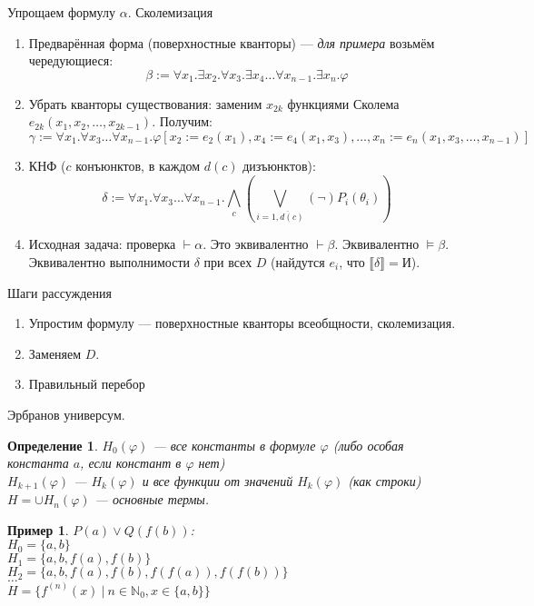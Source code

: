 \documentclass[aspectratio=169]{beamer}
\newtheorem{dfn}{Определение}[section]
\newtheorem{exm}{Пример}[section]
\begin{document}
\begin{frame}{Упрощаем формулу $\alpha$. Сколемизация}
\begin{enumerate}
\item Предварённая форма (поверхностные кванторы) --- \emph{для примера} возьмём чередующиеся:
$$\beta := \forall x_1.\exists x_2.\forall x_3.\exists x_4\dots \forall x_{n-1}.\exists x_n.\varphi$$

\item Убрать кванторы существования: заменим $x_{2k}$ функциями Сколема $e_{2k}(x_1,x_2,\dots,x_{2k-1})$.
Получим: $$\gamma := \forall x_1.\forall x_3\dots\forall x_{n-1}.\varphi[x_2:=e_2(x_1), x_4:=e_4(x_1,x_3), \dots, x_n := e_n(x_1,x_3,\dots,x_{n-1})]$$


\item КНФ ($c$ конъюнктов, в каждом $d(c)$ дизъюнктов):
$$\delta := \forall x_1.\forall x_3\dots\forall x_{n-1}.\bigwedge_c\left(\bigvee_{i = \overline{1,d(c)}} (\neg)P_i(\theta_i)\right)$$

\item Исходная задача: проверка $\vdash\alpha$. Это эквивалентно $\vdash\beta$. Эквивалентно $\models\beta$.
Эквивалентно выполнимости $\delta$ при всех $D$ (найдутся $e_i$, что $\llbracket\delta\rrbracket = \text{И}$).

\end{enumerate}
\end{frame}

\begin{frame}{Шаги рассуждения}
\begin{enumerate}
\item \color{gray}Упростим формулу --- поверхностные кванторы всеобщности, сколемизация.
\item \color{black}Заменяем $D$.
\item \color{gray}Правильный перебор
\end{enumerate}
\end{frame}


\begin{frame}{Эрбранов универсум.}
\begin{dfn}$H_0(\varphi)$ --- все константы в формуле $\varphi$ (либо особая константа $a$, если констант в $\varphi$ нет)\\
$H_{k+1}(\varphi)$ --- $H_k(\varphi)$ и все функции от значений $H_k(\varphi)$ (как строки)\\

$H = \cup H_n(\varphi)$ --- основные термы.
\end{dfn}

\begin{exm}$P(a)\vee Q(f(b))$: \\
$H_0 = \{a,b\}$\\
$H_1 = \{a,b,f(a),f(b)\}$\\
$H_2 = \{a,b,f(a),f(b),f(f(a)),f(f(b))\}$\\
$\dots$\\
$H = \{f^{(n)}(x)\ |\ n \in \mathbb{N}_0, x \in \{a,b\}\}$\end{exm}
\end{frame}
\end{document}
